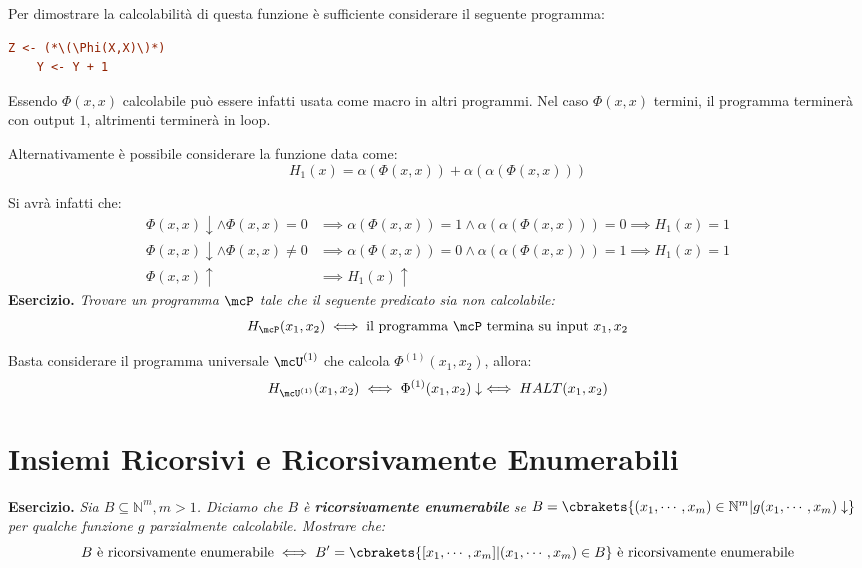 Per dimostrare la calcolabilità di questa funzione è sufficiente considerare il seguente programma:
\begin{lstlisting}[language=ini, label={Programma H1},  caption=Programma H1]
    Z <- (*\(\Phi(X,X)\)*)
    Y <- Y + 1
\end{lstlisting}

Essendo \(\Phi(x,x)\) calcolabile può essere infatti usata come macro in altri programmi.  Nel caso \(\Phi(x,x)\) termini, il programma terminerà con output \(1\), altrimenti terminerà in loop.

Alternativamente è possibile considerare la funzione data come:
\begin{equation}
    H_1(x)=\alpha(\Phi(x,x)) + \alpha(\alpha(\Phi(x,x)))
\end{equation}

Si avrà infatti che:
\begin{equation}
    \begin{split}
        \Phi(x,x)\downarrow \land \Phi(x,x)=0 &\implies \alpha(\Phi(x,x))=1 \land \alpha(\alpha(\Phi(x,x)))=0 \implies H_1(x)=1\\
        \Phi(x,x)\downarrow \land \Phi(x,x)\neq0 &\implies \alpha(\Phi(x,x))=0 \land \alpha(\alpha(\Phi(x,x)))=1 \implies H_1(x)=1\\
        \Phi(x,x)\uparrow & \implies H_1(x)\uparrow
    \end{split}
\end{equation}
\textbf{Esercizio. } \textit{Trovare un programma \(\mcP\) tale che il seguente predicato sia non calcolabile:}
\begin{equation}
    H_{\mcP}(x_1,x_2) \iff \text{il programma \(\mcP\) termina su input \(x_1,x_2\)}
\end{equation}

Basta considerare il programma universale \(\mcU^{(1)}\) che calcola \(\Phi^{(1)}(x_1,x_2)\), allora:
\begin{equation}
    H_{\mcU^{(1)}}(x_1,x_2) \iff \Phi^{(1)}(x_1,x_2)\downarrow \iff HALT(x_1,x_2)
\end{equation}

\section{Insiemi Ricorsivi e Ricorsivamente Enumerabili}

\textbf{Esercizio. } \textit{Sia \(B \subseteq \mathbb{N}^m, m > 1\). Diciamo che \(B\) è \textbf{ricorsivamente enumerabile} se \(B=\cbrakets{(x_1,\cdots, x_m) \in \mathbb{N}^m \vert g(x_1, \cdots, x_m)\downarrow}\) per qualche funzione \(g\) parzialmente calcolabile. Mostrare che:}
\begin{equation}
    \label{Riduzione a N per ricorsivamente enumerabili}
    B \text{ è ricorsivamente enumerabile} \iff B'=\cbrakets{[x_1, \cdots, x_m] \vert (x_1, \cdots, x_m) \in B } \text{ è ricorsivamente enumerabile}
\end{equation}


